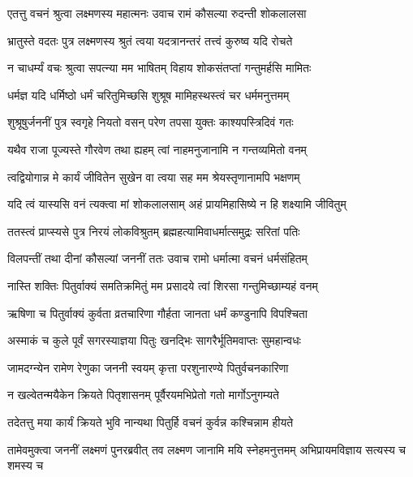 \twolineshloka
{एतत्तु वचनं श्रुत्वा लक्ष्मणस्य महात्मनः}
{उवाच रामं कौसल्या रुदन्ती शोकलालसा} %

\twolineshloka
{भ्रातुस्ते वदतः पुत्र लक्ष्मणस्य श्रुतं त्वया}
{यदत्रानन्तरं तत्त्वं कुरुष्व यदि रोचते} %

\twolineshloka
{न चाधर्म्यं वचः श्रुत्वा सपत्न्या मम भाषितम्}
{विहाय शोकसंतप्तां गन्तुमर्हसि मामितः} %

\twolineshloka
{धर्मज्ञ यदि धर्मिष्ठो धर्मं चरितुमिच्छसि}
{शुश्रूष मामिहस्थस्त्वं चर धर्ममनुत्तमम्} %

\twolineshloka
{शुश्रूषुर्जननीं पुत्र स्वगृहे नियतो वसन्}
{परेण तपसा युक्तः काश्यपस्त्रिदिवं गतः} %

\twolineshloka
{यथैव राजा पूज्यस्ते गौरवेण तथा ह्यहम्}
{त्वां नाहमनुजानामि न गन्तव्यमितो वनम्} %

\twolineshloka
{त्वद्वियोगान्न मे कार्यं जीवितेन सुखेन वा}
{त्वया सह मम श्रेयस्तृणानामपि भक्षणम्} %

\twolineshloka
{यदि त्वं यास्यसि वनं त्यक्त्वा मां शोकलालसाम्}
{अहं प्रायमिहासिष्ये न हि शक्ष्यामि जीवितुम्} %

\twolineshloka
{ततस्त्वं प्राप्स्यसे पुत्र निरयं लोकविश्रुतम्}
{ब्रह्महत्यामिवाधर्मात्समुद्रः सरितां पतिः} %

\twolineshloka
{विलपन्तीं तथा दीनां कौसल्यां जननीं ततः}
{उवाच रामो धर्मात्मा वचनं धर्मसंहितम्} %

\twolineshloka
{नास्ति शक्तिः पितुर्वाक्यं समतिक्रमितुं मम}
{प्रसादये त्वां शिरसा गन्तुमिच्छाम्यहं वनम्} %

\twolineshloka
{ऋषिणा च पितुर्वाक्यं कुर्वता व्रतचारिणा}
{गौर्हता जानता धर्मं कण्डुनापि विपश्चिता} %

\twolineshloka
{अस्माकं च कुले पूर्वं सगरस्याज्ञया पितुः}
{खनद्भिः सागरैर्भूतिमवाप्तः सुमहान्वधः} %

\twolineshloka
{जामदग्न्येन रामेण रेणुका जननी स्वयम्}
{कृत्ता परशुनारण्ये पितुर्वचनकारिणा} %

\twolineshloka
{न खल्वेतन्मयैकेन क्रियते पितृशासनम्}
{पूर्वैरयमभिप्रेतो गतो मार्गोऽनुगम्यते} %

\twolineshloka
{तदेतत्तु मया कार्यं क्रियते भुवि नान्यथा}
{पितुर्हि वचनं कुर्वन्न कश्चिन्नाम हीयते} %

\threelineshloka
{तामेवमुक्त्वा जननीं लक्ष्मणं पुनरब्रवीत्}
{तव लक्ष्मण जानामि मयि स्नेहमनुत्तमम्}
{अभिप्रायमविज्ञाय सत्यस्य च शमस्य च} %


